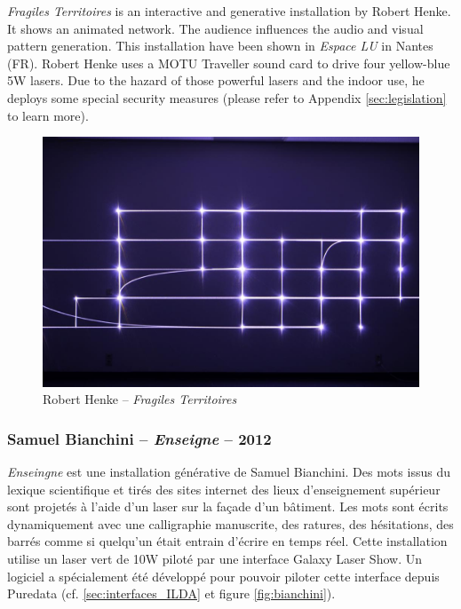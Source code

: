 \begin{en}
\textit{Fragiles Territoires} is an interactive and generative installation by Robert Henke.
It shows an animated network.
The audience influences the audio and visual pattern generation.
This installation have been shown in \textit{Espace LU} in Nantes (FR).
Robert Henke uses a MOTU Traveller sound card to drive four yellow-blue 5\unit{W} lasers.
Due to the hazard of those powerful lasers and the indoor use, he deploys some special security measures (please refer to Appendix \ref{sec:legislation} to learn more).
\end{en}

\begin{figure}[ht]
\begin{center}
\includegraphics[width=\textwidth]{images/FragileTerritories.jpg} 
\end{center}
\caption{Robert Henke -- \textit{Fragiles Territoires}}
\label{fig:henke}
\end{figure}

\begin{fr}
\subsubsection{Samuel Bianchini -- \textit{Enseigne} -- 2012}
\textit{Enseingne} est une installation générative de Samuel Bianchini. Des mots issus du lexique scientifique et tirés des sites internet des lieux d'enseignement supérieur sont projetés à l'aide d'un laser sur la façade d'un bâtiment.
Les mots sont écrits dynamiquement avec une calligraphie manuscrite, des ratures, des hésitations, des barrés comme si quelqu'un était entrain d'écrire en temps réel.
Cette installation utilise un laser vert de 10\unit{W} piloté par une interface Galaxy Laser Show.
Un logiciel a spécialement été développé pour pouvoir piloter cette interface depuis Puredata (cf. \ref{sec:interfaces_ILDA} et figure \ref{fig:bianchini}).
\end{fr}

